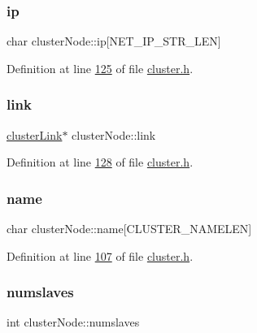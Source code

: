 \subsubsection{\texorpdfstring{ip}{ip}}
{\footnotesize\ttfamily char cluster\+Node\+::ip\mbox{[}N\+E\+T\+\_\+\+I\+P\+\_\+\+S\+T\+R\+\_\+\+L\+EN\mbox{]}}



Definition at line \hyperlink{cluster_8h_source_l00125}{125} of file \hyperlink{cluster_8h_source}{cluster.\+h}.

\mbox{\label{structclusterNode_a2a132086324ba85e15a911b9bd5ef94b}} 
\subsubsection{\texorpdfstring{link}{link}}
{\footnotesize\ttfamily \hyperlink{structclusterLink}{cluster\+Link}$\ast$ cluster\+Node\+::link}



Definition at line \hyperlink{cluster_8h_source_l00128}{128} of file \hyperlink{cluster_8h_source}{cluster.\+h}.

\mbox{\label{structclusterNode_ae0214470697f2a171d6cdd3493facbb2}} 
\subsubsection{\texorpdfstring{name}{name}}
{\footnotesize\ttfamily char cluster\+Node\+::name\mbox{[}C\+L\+U\+S\+T\+E\+R\+\_\+\+N\+A\+M\+E\+L\+EN\mbox{]}}



Definition at line \hyperlink{cluster_8h_source_l00107}{107} of file \hyperlink{cluster_8h_source}{cluster.\+h}.

\mbox{\label{structclusterNode_a7e3b31fb7e833940d50a5a7d7d1f148d}} 
\subsubsection{\texorpdfstring{numslaves}{numslaves}}
{\footnotesize\ttfamily int cluster\+Node\+::numslaves}



